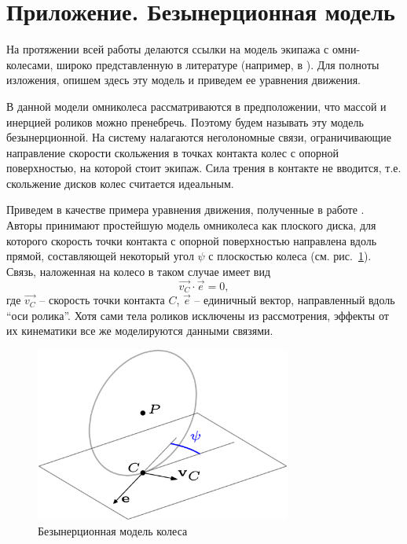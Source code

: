 \section{Приложение. Безынерционная модель}\label{sect:bezinerz}

На протяжении всей работы делаются ссылки на модель экипажа с омни-колесами, широко представленную в литературе (например, в \cite{Borisov2011, formalskii, ZobovaTatarinovPMM}). Для полноты изложения, опишем здесь эту модель и приведем ее уравнения движения.

В данной модели омниколеса рассматриваются в предположении, что массой и инерцией роликов можно пренебречь. Поэтому будем называть эту модель безынерционной. На систему налагаются неголономные связи, ограничивающие направление скорости скольжения в точках контакта колес с опорной поверхностью, на которой стоит экипаж. Сила трения в контакте не вводится, т.е. скольжение дисков колес считается идеальным.

Приведем в качестве примера уравнения движения, полученные в работе \cite{Borisov2011}. Авторы принимают простейшую модель омниколеса как плоского диска, для которого скорость точки контакта с опорной поверхностью направлена вдоль прямой, составляющей некоторый угол $\psi$ с плоскостью колеса (см. рис.~\ref{fig:bor_wheel_scheme}). Связь, наложенная на колесо в таком случае имеет вид
$$
    \vec{v_C} \cdot \vec{e} = 0,
$$
где $\vec{v_C}$ -- скорость точки контакта $C$, $\vec{e}$ -- единичный вектор, направленный вдоль ``оси ролика''. Хотя сами тела роликов исключены из рассмотрения, эффекты от их кинематики все же моделируются данными связями.\\

\begin{figure}[ht!]
    \centering
    \includegraphics[width=0.75\textwidth]{content/pic/asy/wheel_bor.png}
    \caption{Безынерционная модель колеса}
    \label{fig:bor_wheel_scheme}
\end{figure}

